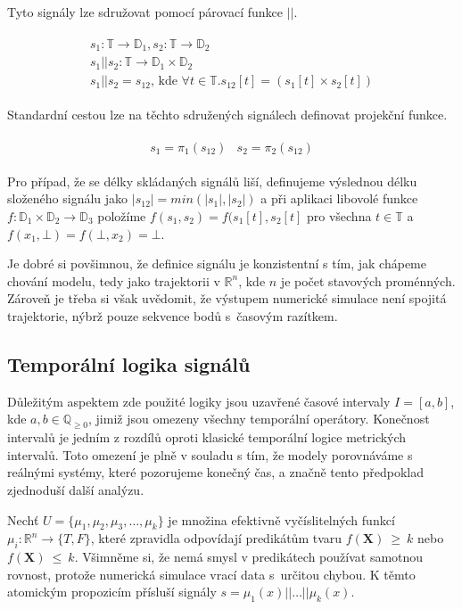 Tyto signály lze sdružovat pomocí párovací funkce $||$.

\begin{align}\label{eq:signals:pairing}
\begin{array}{ll}
s_1: \mathbb{T} \rightarrow \mathbb{D}_1, s_2: \mathbb{T} \rightarrow \mathbb{D}_2	\\
s_1 || s_2: \mathbb{T} \rightarrow \mathbb{D}_1 \times\mathbb{D}_2		\\
s_1 || s_2= s_{12}\textrm{, kde }\forall t\in\mathbb{T}. s_{12}[t] = (s_1[t] \times s_2[t])
\end{array}
\end{align}

Standardní cestou lze na těchto sdružených signálech definovat projekční funkce.

\begin{align}\label{eq:signals:pairing}
\begin{array}{ll}
s_1 = \pi_1(s_{12})		& s_2 = \pi_2(s_{12})
\end{array}
\end{align}

Pro případ, že se délky skládaných signálů liší, definujeme výslednou délku
složeného signálu jako $|s_{12}| = min(|s_1|, |s_2|)$ a při aplikaci libovolé
funkce $f: \mathbb{D}_1 \times \mathbb{D}_2 \rightarrow \mathbb{D}_3$
položíme $f(s_1, s_2) = f(s_1[t], s_2[t]$ pro všechna $t \in \mathbb{T}$ a
$f(x_1, \bot) = f(\bot, x_2) = \bot$.

Je dobré si povšimnou, že definice signálu je konzistentní s tím, jak chápeme chování modelu,
tedy jako trajektorii v $\mathbb{R}^n$, kde $n$ je počet sta\-vo\-vých proménných. Zároveň
je třeba si však uvědomit, že výstupem numerické simulace není spojitá trajektorie, nýbrž pouze
sekvence bodů s~časovým razítkem.

\subsection{Temporální logika signálů}
Důležitým aspektem zde použité logiky jsou uzavřené časové intervaly $I = [a, b]$, kde $a, b \in \mathbb{Q}_{\geq0}$,
jimiž jsou omezeny všechny temporální operátory. Konečnost intervalů je jedním z rozdílů
oproti klasické temporální logice metrických intervalů. Toto omezení je plně v souladu s tím,
že modely porovnáváme s reálnými systémy, které pozorujeme konečný čas, a značně tento předpoklad
zjedno\-du\-ší další analýzu.

Nechť $U = \{\mu_1, \mu_2, \mu_3, \ldots, \mu_k\}$ je množina efektivně vyčíslitelných funkcí
$\mu_i: \mathbb{R}^n \rightarrow \{T, F\}$, které zpravidla odpovídají predikátům tvaru
$f(\mathbf{X})~\geq~k$ nebo $f(\mathbf{X})~\leq~k$. Všimněme si, že nemá smysl v predikátech
používat samotnou rovnost, protože numerická simulace vrací data s~určitou chybou.
K těmto atomickým propozicím přísluší signály $s = \mu_1(x)|| \ldots|| \mu_k(x)$.

